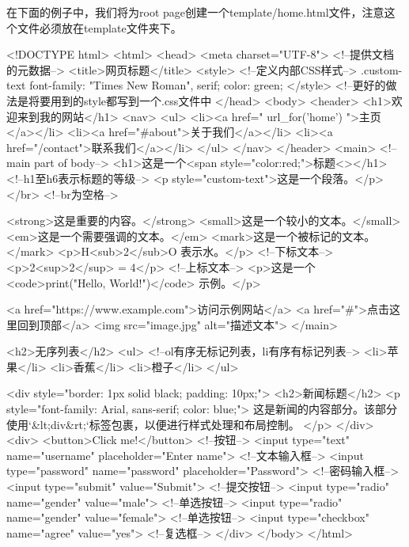       在下面的例子中，我们将为root page创建一个template/home.html文件，注意这个文件必须放在template文件夹下。
      \begin{codeblock}[language=html, caption={template/home.html}]
        <!DOCTYPE html>
        <html>
        <head>
            <meta charset="UTF-8"> <!--提供文档的元数据-->
            <title>网页标题</title>
            <style> <!--定义内部CSS样式-->
                .custom-text {
                    font-family: "Times New Roman", serif;
                    color: green;
                }
            </style> <!--更好的做法是将要用到的style都写到一个.css文件中
        </head>
        <body>
            <header>
                <h1>欢迎来到我的网站</h1>
                <nav>
                    <ul>
                        <li><a href="{{ url_for('home') }}">主页</a></li>
                        <li><a href="#about">关于我们</a></li>
                        <li><a href="/contact">联系我们</a></li>
                    </ul>
                </nav>
            </header>
            <main> <!--main part of body-->
                <h1>这是一个<span style="color:red;">标题<\span></h1> <!--h1至h6表示标题的等级-->
                <p style="custom-text">这是一个段落。</p></br> <!--br为空格-->

                <strong>这是重要的内容。</strong>
                <small>这是一个较小的文本。</small>
                <em>这是一个需要强调的文本。</em>
                <mark>这是一个被标记的文本。</mark>
                <p>H<sub>2</sub>O 表示水。</p> <!--下标文本-->
                <p>2<sup>2</sup> = 4</p> <!--上标文本-->
                <p>这是一个 <code>print("Hello, World!")</code> 示例。</p>

                <a href="https://www.example.com">访问示例网站</a>
                <a href="#">点击这里回到顶部</a>
                <img src="image.jpg" alt="描述文本">
            </main>

            <h2>无序列表</h2>
            <ul> <!--ol有序无标记列表，li有序有标记列表-->
                <li>苹果</li>
                <li>香蕉</li>
                <li>橙子</li>
            </ul>

            <div style="border: 1px solid black; padding: 10px;">
                <h2>新闻标题</h2>
                <p style="font-family: Arial, sans-serif; color: blue;">
                    这是新闻的内容部分。该部分使用`&lt;div&rt;`标签包裹，以便进行样式处理和布局控制。
                </p>
            </div>
            <div>
                <button>Click me!</button> <!--按钮-->
                <input type="text" name="username" placeholder="Enter name"> <!--文本输入框-->
                <input type="password" name="password" placeholder="Password"> <!--密码输入框-->
                <input type="submit" value="Submit"> <!--提交按钮-->
                <input type="radio" name="gender" value="male"> <!--单选按钮-->
                <input type="radio" name="gender" value="female"> <!--单选按钮-->
                <input type="checkbox" name="agree" value="yes"> <!--复选框-->
            </div> 
        </body>
        </html>
      \end{codeblock}


